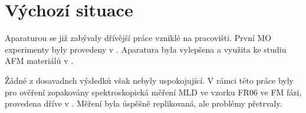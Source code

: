 \section{Výchozí situace}
\label{chap:vychozi-situace}

Aparaturou se již zabývaly dřívější práce vzniklé na pracovišti.
První MO experimenty byly provedeny v \cite{wohlrathMagnetooptickaCharakterizaceSpintronickych2018}. 
Aparatura byla vylepšena a využita ke studiu AFM materiálů v \cite{kubascikMagnetooptickeStudiumAntiferomagnetickych2019,kimakOptickaSpektroskopieAntiferomagnetu2019}.

Žádné z dosavadnch výsledků však nebyly uspokojující.
V rámci této práce byly pro ověření zopakovány spektroskopická měření MLD ve vzorku FR06 ve FM fázi, provedena dříve v \cite{kubascikMagnetooptickeStudiumAntiferomagnetickych2019}.
Měření byla úspěšně replikovaná, ale problémy přetrvaly.


